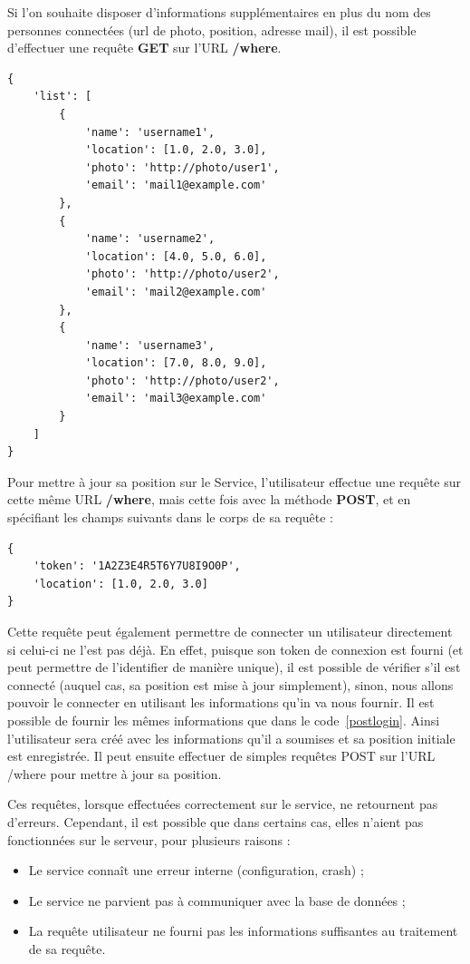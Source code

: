 Si l'on souhaite disposer d'informations supplémentaires en plus du nom des personnes connectées (url de photo, position, adresse mail), il est possible d'effectuer une requête \textbf{GET} sur l'URL \textbf{/where}.
\lstset{language=Javascript}
\begin{lstlisting}[caption=Corps de la réponse GET /where]
{
    'list': [
        {
            'name': 'username1',
            'location': [1.0, 2.0, 3.0],
            'photo': 'http://photo/user1',
            'email': 'mail1@example.com'
        },
        {
            'name': 'username2',
            'location': [4.0, 5.0, 6.0],
            'photo': 'http://photo/user2',
            'email': 'mail2@example.com'
        },
        {
            'name': 'username3',
            'location': [7.0, 8.0, 9.0],
            'photo': 'http://photo/user2',
            'email': 'mail3@example.com'
        }
    ]
}
\end{lstlisting}

Pour mettre à jour sa position sur le Service, l'utilisateur effectue une requête sur cette même URL \textbf{/where}, mais cette fois avec la méthode \textbf{POST}, et en spécifiant les champs suivants dans le corps de sa requête :
\lstset{language=Javascript}
\begin{lstlisting}[caption=Corps de la requête POST /where]
{
    'token': '1A2Z3E4R5T6Y7U8I9O0P',
    'location': [1.0, 2.0, 3.0]
}
\end{lstlisting}

Cette requête peut également permettre de connecter un utilisateur directement si celui-ci ne l'est pas déjà. En effet, puisque son token de connexion est fourni (et peut permettre de l'identifier de manière unique), il est possible de vérifier s'il est connecté (auquel cas, sa position est mise à jour simplement), sinon, nous allons pouvoir le connecter en utilisant les informations qu'in va nous fournir. Il est possible de fournir les mêmes informations que dans le code~\ref{postlogin}. Ainsi l'utilisateur sera créé avec les informations qu'il a soumises et sa position initiale est enregistrée. Il peut ensuite effectuer de simples requêtes POST sur l'URL /where pour mettre à jour sa position.

Ces requêtes, lorsque effectuées correctement sur le service, ne retournent pas d'erreurs. Cependant, il est possible que dans certains cas, elles n'aient pas fonctionnées sur le serveur, pour plusieurs raisons :
\begin{itemize}
    \item Le service connaît une erreur interne (configuration, crash) ;
    \item Le service ne parvient pas à communiquer avec la base de données ;
    \item La requête utilisateur ne fourni pas les informations suffisantes au traitement de sa requête.
\end{itemize}

